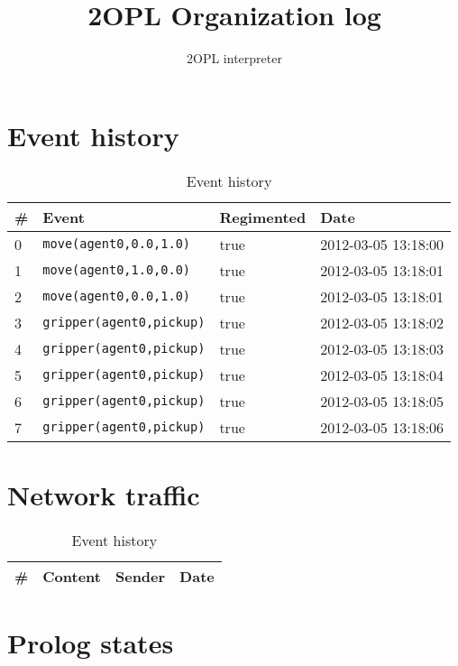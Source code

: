 \documentclass[11pt]{article}\usepackage[utf8]{inputenc}\usepackage{geometry}
\title{2OPL Organization log}
\author{2OPL interpreter}
\begin{document}
\maketitle
\tableofcontents

\section{Event history}

\begin{table}[ht]
\centering 
\begin{tabular}{l l l l} 
\textbf{\#} & \textbf{Event} & \textbf{Regimented} & \textbf{Date} \\ [0.5ex] 
\hline
0&\texttt{move(agent0,0.0,1.0)}&true&2012-03-05 13:18:00\\ [1ex] \hline
1&\texttt{move(agent0,1.0,0.0)}&true&2012-03-05 13:18:01\\ [1ex] \hline
2&\texttt{move(agent0,0.0,1.0)}&true&2012-03-05 13:18:01\\ [1ex] \hline
3&\texttt{gripper(agent0,pickup)}&true&2012-03-05 13:18:02\\ [1ex] \hline
4&\texttt{gripper(agent0,pickup)}&true&2012-03-05 13:18:03\\ [1ex] \hline
5&\texttt{gripper(agent0,pickup)}&true&2012-03-05 13:18:04\\ [1ex] \hline
6&\texttt{gripper(agent0,pickup)}&true&2012-03-05 13:18:05\\ [1ex] \hline
7&\texttt{gripper(agent0,pickup)}&true&2012-03-05 13:18:06\\ [1ex] \hline
\end{tabular}
\caption{Event history}
\label{events}  
\end{table}

\section{Network traffic}

\begin{table}[ht]
\centering 
\begin{tabular}{l l l l} 
\textbf{\#} & \textbf{Content} & \textbf{Sender} & \textbf{Date} \\ [0.5ex] 
\hline
\end{tabular}
\caption{Event history}
\label{events}  
\end{table}

\section{Prolog states}
\clearpage 
\end{document}
